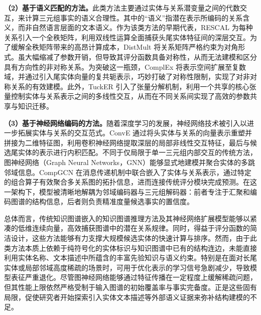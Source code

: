 \textbf{（2）基于语义匹配的方法。}此类方法主要通过实体与关系潜变量之间的代数交互，来计算三元组事实的语义合理性。其中的“语义”指潜在表示所编码的关系含义，而非自然语言层面的文本语义。作为该类方法的早期代表，RESCAL 为每种关系引入一个全秩矩阵，利用双线性运算全面捕获头尾实体特征间的深层交互\cite{RESCAL_Nickel_2011}。为了缓解全秩矩阵带来的高昂计算成本，DistMult 将关系矩阵严格约束为对角形式。虽大幅缩减了参数开销，但导致其评分函数具备对称性，从而无法建模和区分具有方向性的非对称关系\cite{yang2015embedding}。为突破这一瓶颈，ComplEx 将表示空间扩展至复数域，并通过引入尾实体向量的复共轭表示，巧妙打破了对称性限制，实现了对非对称关系的有效建模\cite{trouillon2016complex}。此外，TuckER 引入了张量分解机制，利用一个共享的核心张量控制实体与关系表示之间的多线性交互，从而在不同关系间实现了高效的参数共享与知识迁移\cite{TuckER_Balazevic_2019}。

\textbf{（3）基于神经网络编码的方法。}随着深度学习的发展，神经网络技术被引入以进一步拓展实体与关系的交互范式。ConvE 通过将头实体与关系的向量表示重塑并拼接为二维特征图，利用卷积神经网络提取深层的局部非线性交互特征，最后与候选尾实体的表示进行内积匹配\cite{dettmers2018conve}。不同于仅局限于单一三元组内部交互的传统方法，图神经网络（Graph Neural Networks，GNN）能够显式地建模并聚合实体的多跳邻域信息。CompGCN 在消息传递机制中联合嵌入了实体与关系表示，通过特定的组合算子有效聚合多关系图的拓扑信息，进而连接传统评分模块完成预测\cite{vashishth2020composition}。在这一架构下，模型被清晰地解耦为邻域编码器与三元组解码器：前者专注于汇聚和编码图谱的结构信息，后者则负责精准度量候选事实的置信度。

总体而言，传统知识图谱嵌入的知识图谱推理方法及其神经网络扩展模型能够以紧凑的低维连续向量，高效捕获图谱中的潜在关系规律。同时，得益于评分函数的简洁设计，这些方法能够有力支撑大规模候选实体的快速计算与排序。然而，由于此类方法本质上依赖于纯符号化的实体标识与知识图谱中已有的结构连边，未能直接利用实体名称、文本描述中所蕴含的丰富先验知识与语义约束。特别是在面对长尾实体或局部邻域高度稀疏的场景时，可用于优化表示的学习信号急剧减少，导致模型表征严重退化。尽管图神经网络能够通过特征传播在一定程度上缓解稀疏问题，但其性能上限依然严格受制于输入图谱的初始覆盖率与事实完备度。正是这些固有局限，促使研究者开始探索引入实体文本描述等外部语义证据来弥补结构建模的不足。

